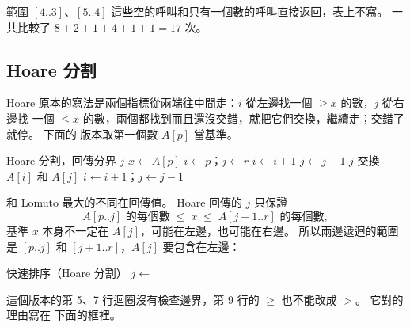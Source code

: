 範圍 $[4..3]$、$[5..4]$ 這些空的呼叫和只有一個數的呼叫直接返回，表上不寫。 一共比較了
$8 + 2 + 1 + 4 + 1 + 1 = 17$ 次。

\subsection{Hoare 分割}

Hoare 原本的寫法是兩個指標從兩端往中間走：$i$ 從左邊找一個 $\ge x$ 的數，$j$ 從右邊找
一個 $\le x$ 的數，兩個都找到而且還沒交錯，就把它們交換，繼續走；交錯了就停。 下面的
版本取第一個數 $A[p]$ 當基準。

\begin{pseudo}[label=alg:so-hoare]{Hoare 分割，回傳分界 $j$}
    \State $x \gets A[p]$ 
    \State $i \gets p$；$j \gets r$
    \While{\TRUE}
            \State $i \gets i + 1$
        \EndWhile
            \State $j \gets j - 1$
        \EndWhile
            \State \Return $j$
        \EndIf
        \State 交換 $A[i]$ 和 $A[j]$
        \State $i \gets i + 1$；$j \gets j - 1$
    \EndWhile
\EndFunction
\end{pseudo}

和 Lomuto 最大的不同在回傳值。 Hoare 回傳的 $j$ 只保證
\[
A[p..j] \text{ 的每個數} \;\le\; x \;\le\; A[j+1..r] \text{ 的每個數},
\]
基準 $x$ 本身不一定在 $A[j]$，可能在左邊，也可能在右邊。 所以兩邊遞迴的範圍是
$[p..j]$ 和 $[j+1..r]$，$A[j]$ 要包含在左邊：

\begin{pseudo}[label=alg:so-quick-hoare]{快速排序（Hoare 分割）}
        \State $j \gets$ 
        \State {}
        \State {}
    \EndIf
\EndProcedure
\end{pseudo}

這個版本的第 5、7 行迴圈沒有檢查邊界，第 9 行的 $\ge$ 也不能改成 $>$。 它對的理由寫在
下面的框裡。

